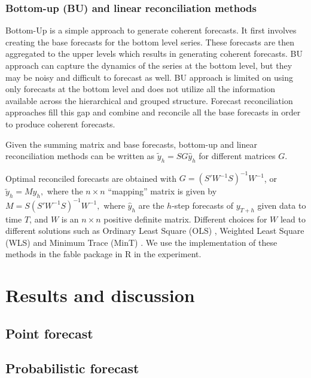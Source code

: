 \documentclass[
  authoryear,
  preprint,
  3p]{elsarticle}
\begin{document}
\hypertarget{bottom-up-bu-and-linear-reconciliation-methods}{%
\subsubsection{Bottom-up (BU) and linear reconciliation
methods}\label{bottom-up-bu-and-linear-reconciliation-methods}}

Bottom-Up is a simple approach to generate coherent forecasts. It first
involves creating the base forecasts for the bottom level series. These
forecasts are then aggregated to the upper levels which results in
generating coherent forecasts. BU approach can capture the dynamics of
the series at the bottom level, but they may be noisy and difficult to
forecast as well. BU approach is limited on using only forecasts at the
bottom level and does not utilize all the information available across
the hierarchical and grouped structure. Forecast reconciliation
approaches fill this gap and combine and reconcile all the base
forecasts in order to produce coherent forecasts.

Given the summing matrix and base forecasts, bottom-up and linear
reconciliation methods can be written as \(\tilde{y}_h = SG\hat{y}_h\)
for different matrices \(G\).

Optimal reconciled forecasts are obtained with
\(G=(S'W^{-1}S)^{-1}W^{-1}\), or \(\tilde{y}_h = M\hat{y}_h,\) where the
\(n\times n\) ``mapping'' matrix is given by
\(M = S(S'W^{-1}S)^{-1}W^{-1},\) where \(\hat{y}_h\) are the \(h\)-step
forecasts of \(y_{T+h}\) given data to time \(T\), and \(W\) is an
\(n \times n\) positive definite matrix. Different choices for \(W\)
lead to different solutions such as Ordinary Least Square (OLS) ,
Weighted Least Square (WLS) and Minimum Trace (MinT)
\citep{WicEtAl2019}. We use the implementation of these methods in the
fable package in R in the experiment.

\hypertarget{sec-result}{%
\section{Results and discussion}\label{sec-result}}

\hypertarget{point-forecast}{%
\subsection{Point forecast}\label{point-forecast}}

\hypertarget{probabilistic-forecast}{%
\subsection{Probabilistic forecast}\label{probabilistic-forecast}}
\end{document}
